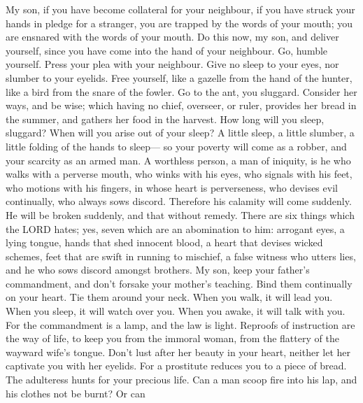  My son, if you have become collateral for your neighbour,
if you have struck your hands in pledge for a stranger,  you
are trapped by the words of your mouth; you are ensnared with the words
of your mouth.  Do this now, my son, and deliver yourself,
since you have come into the hand of your neighbour. Go, humble
yourself. Press your plea with your neighbour.  Give no
sleep to your eyes, nor slumber to your eyelids.  Free
yourself, like a gazelle from the hand of the hunter, like a bird from
the snare of the fowler.  Go to the ant, you sluggard.
Consider her ways, and be wise;  which having no chief,
overseer, or ruler,  provides her bread in the summer, and
gathers her food in the harvest.  How long will you sleep,
sluggard? When will you arise out of your sleep?  A little
sleep, a little slumber, a little folding of the hands to sleep---
 so your poverty will come as a robber, and your scarcity
as an armed man.  A worthless person, a man of iniquity, is
he who walks with a perverse mouth,  who winks with his
eyes, who signals with his feet, who motions with his fingers,
 in whose heart is perverseness, who devises evil
continually, who always sows discord.  Therefore his
calamity will come suddenly. He will be broken suddenly, and that
without remedy.  There are six things which the LORD hates;
yes, seven which are an abomination to him:  arrogant eyes,
a lying tongue, hands that shed innocent blood,  a heart
that devises wicked schemes, feet that are swift in running to mischief,
 a false witness who utters lies, and he who sows discord
amongst brothers.  My son, keep your father's commandment,
and don't forsake your mother's teaching.  Bind them
continually on your heart. Tie them around your neck.  When
you walk, it will lead you. When you sleep, it will watch over you. When
you awake, it will talk with you.  For the commandment is a
lamp, and the law is light. Reproofs of instruction are the way of life,
 to keep you from the immoral woman, from the flattery of
the wayward wife's tongue.  Don't lust after her beauty in
your heart, neither let her captivate you with her eyelids.
 For a prostitute reduces you to a piece of bread. The
adulteress hunts for your precious life.  Can a man scoop
fire into his lap, and his clothes not be burnt?  Or can
